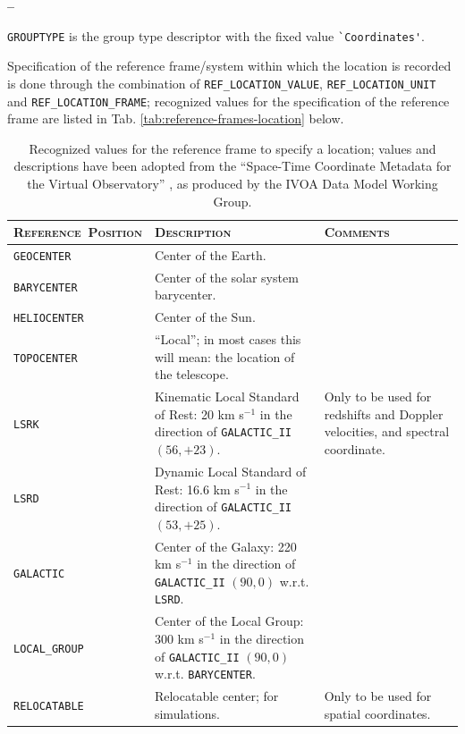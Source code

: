 \documentclass[a4paper,10pt,bibtotoc]{scrreprt}
\begin{document}

\begin{list}{\textbf{--}}{}
\item \verb|GROUPTYPE| is the group type descriptor with the fixed value
  \verb|`Coordinates'|.
\item Specification of the reference frame/system within which the
  location is recorded is done through the combination of \verb|REF_LOCATION_VALUE|,
  \verb|REF_LOCATION_UNIT| and \verb|REF_LOCATION_FRAME|; recognized
  values for the specification of the reference frame are listed in
  Tab. \ref{tab:reference-frames-location} below.
  
  \begin{table}[ht]
    \centering
    \begin{tabular}{|p{3.5cm}p{6cm}p{5cm}|}
      \hline
      \textsc{Reference~Position} & \textsc{Description} & \textsc{Comments} \\
      \hline \hline
      \verb|GEOCENTER|    & Center of the Earth. & \\
      \verb|BARYCENTER|   & Center of the solar system barycenter. &  \\
      \verb|HELIOCENTER|  & Center of the Sun. &  \\
      \verb|TOPOCENTER|   & ``Local''; in most cases this will mean:
      the location of the telescope. &  \\
      \verb|LSRK|         & Kinematic Local Standard of Rest: 20 km
      s$^{-1}$ in the direction of \verb|GALACTIC_II| $(56,+23)$. & Only to be
      used for redshifts and Doppler velocities, and spectral coordinate. \\
      \verb|LSRD|         & Dynamic Local Standard of Rest: 16.6 km
      s$^{-1}$ in the direction of \verb|GALACTIC_II| $(53,+25)$. &  \\
      \verb|GALACTIC|     & Center of the Galaxy: 220 km s$^{-1}$ in
      the direction of \verb|GALACTIC_II| $(90,0)$ w.r.t. \texttt{LSRD}. &  \\
      \verb|LOCAL_GROUP|  & Center of the Local Group: 300 km s$^{-1}$ in
      the direction of \verb|GALACTIC_II| $(90,0)$ w.r.t. \texttt{BARYCENTER}. &  \\
      \verb|RELOCATABLE|  & Relocatable center; for simulations. & Only to be used
      for spatial coordinates. \\
      \hline
    \end{tabular}
    \caption[Recognized values for the reference frame to specify a
      location]{Recognized values for the reference frame to specify a
      location; values and descriptions have been adopted from the
      ``Space-Time Coordinate Metadata for the Virtual Observatory''
      \cite{ivoa.stc}, as produced by the IVOA Data Model Working Group.}
    \label{tab:reference frames location}
  \end{table}
  

\end{list}
\end{document}

